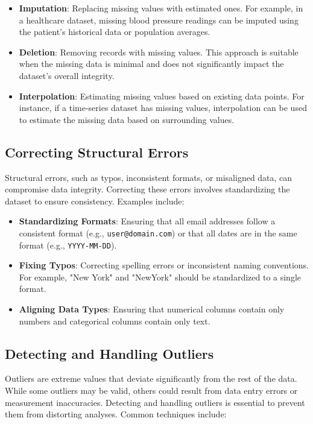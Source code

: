\documentclass[12pt]{article}
\begin{document}
\begin{itemize}
    \item \textbf{Imputation}: Replacing missing values with estimated ones. For example, in a healthcare dataset, missing blood pressure readings can be imputed using the patient’s historical data or population averages.
    \item \textbf{Deletion}: Removing records with missing values. This approach is suitable when the missing data is minimal and does not significantly impact the dataset’s overall integrity.
    \item \textbf{Interpolation}: Estimating missing values based on existing data points. For instance, if a time-series dataset has missing values, interpolation can be used to estimate the missing data based on surrounding values.
\end{itemize}

\subsection{Correcting Structural Errors}
Structural errors, such as typos, inconsistent formats, or misaligned data, can compromise data integrity. Correcting these errors involves standardizing the dataset to ensure consistency. Examples include:

\begin{itemize}
    \item \textbf{Standardizing Formats}: Ensuring that all email addresses follow a consistent format (e.g., \texttt{user@domain.com}) or that all dates are in the same format (e.g., \texttt{YYYY-MM-DD}).
    \item \textbf{Fixing Typos}: Correcting spelling errors or inconsistent naming conventions. For example, "New York" and "NewYork" should be standardized to a single format.
    \item \textbf{Aligning Data Types}: Ensuring that numerical columns contain only numbers and categorical columns contain only text.
\end{itemize}

\subsection{Detecting and Handling Outliers}
Outliers are extreme values that deviate significantly from the rest of the data. While some outliers may be valid, others could result from data entry errors or measurement inaccuracies. Detecting and handling outliers is essential to prevent them from distorting analyses. Common techniques include:
\end{document}
